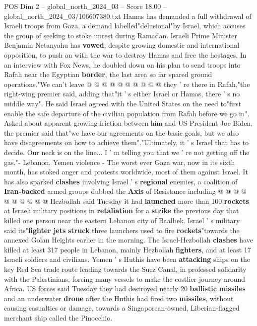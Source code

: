 \begin{textsample}{POS Dim 2 – global\_north\_2024\_03 – Score 18.00 – global\_north\_2024\_03/106607380.txt}
Hamas has demanded a full withdrawal of Israeli troops from Gaza, a demand labelled"delusional"by Israel, which accuses the group of seeking to stoke unrest during Ramadan.
Israeli Prime Minister Benjamin Netanyahu has \textbf{vowed}, despite growing domestic and international opposition, to push on with the war to destroy Hamas and free the hostages.
In an interview with Fox News, he doubled down on his plan to send troops into Rafah near the Egyptian \textbf{border}, the last area so far spared ground operations."We can't leave @ @ @ @ @ @ @ @ @ @ they ' re there in Rafah,"the right-wing premier said, adding that"it ' s either Israel or Hamas, there ' s no middle way".
He said Israel agreed with the United States on the need to"first enable the safe departure of the civilian population from Rafah before we go in".
Asked about apparent growing friction between him and US President Joe Biden, the premier said that"we have our agreements on the basic goals, but we also have disagreements on how to achieve them"."Ultimately, it ' s Israel that has to decide.
Our neck is on the line...
I ' m telling you that we ' re not getting off the gas."- Lebanon, Yemen violence - The worst ever Gaza war, now in its sixth month, has stoked anger and protests worldwide, most of them against Israel.
It has also sparked \textbf{clashes} involving Israel ' s \textbf{regional} enemies, a coalition of \textbf{Iran-backed} armed groups dubbed the \textbf{Axis} of Resistance including @ @ @ @ @ @ @ @ @ @ Hezbollah said Tuesday it had \textbf{launched} more than 100 \textbf{rockets} at Israeli military positions in \textbf{retaliation} for a \textbf{strike} the previous day that killed one person near the eastern Lebanon city of Baalbek.
Israel ' s military said its"\textbf{fighter} \textbf{jets} \textbf{struck} three launchers used to fire \textbf{rockets}"towards the annexed Golan Heights earlier in the morning.
The Israel-Hezbollah \textbf{clashes} have killed at least 317 people in Lebanon, mainly Hezbollah \textbf{fighters}, and at least 17 Israeli soldiers and civilians.
Yemen ' s Huthis have been \textbf{attacking} ships on the key Red Sea trade route leading towards the Suez Canal, in professed solidarity with the Palestinians, forcing many vessels to make the costlier journey around Africa.
US forces said Tuesday they had destroyed nearly 20 \textbf{ballistic} \textbf{missiles} and an underwater \textbf{drone} after the Huthis had fired two \textbf{missiles}, without causing casualties or damage, towards a Singaporean-owned, Liberian-flagged merchant ship called the Pinocchio.

\end{textsample}
